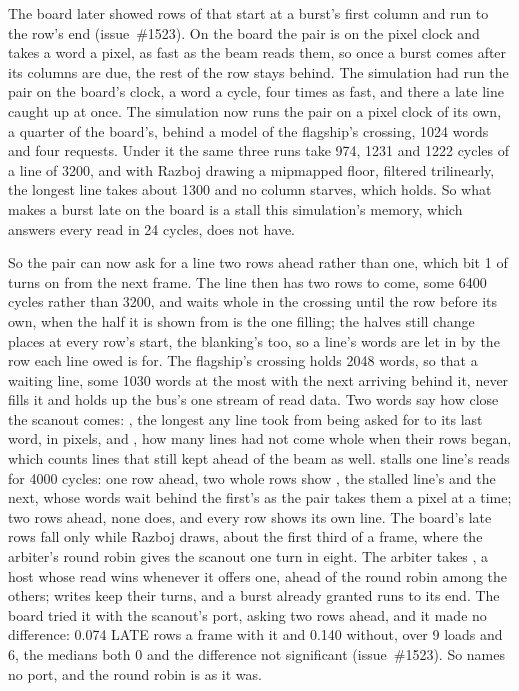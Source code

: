 \documentclass[journal,onecolumn,9pt]{IEEEtran}
\begin{document}
The board later showed rows of  that start at a burst's
first column and run to the row's end (issue~\#1523). On the board the
pair is on the pixel clock and takes a word a pixel, as fast as the
beam reads them, so once a burst comes after its columns are due, the
rest of the row stays behind. The simulation had run the pair on the
board's clock, a word a cycle, four times as fast, and there a late
line caught up at once. The simulation now runs the pair on a pixel
clock of its own, a quarter of the board's, behind a model of the
flagship's crossing, 1024 words and four requests. Under it the same
three runs take 974, 1231 and 1222 cycles of a line of 3200, and with
Razboj drawing a mipmapped floor, filtered trilinearly, the longest line
takes about 1300 and no column starves, which
 holds. So what makes a
burst late on the board is a stall this simulation's memory, which
answers every read in 24 cycles, does not have.

So the pair can now ask for a line two rows ahead rather than one,
which bit 1 of  turns on from the next frame. The line then
has two rows to come, some 6400 cycles rather than 3200, and waits
whole in the crossing until the row before its own, when the half it
is shown from is the one filling; the halves still change places at
every row's start, the blanking's too, so a line's words are let in by
the row each line owed is for. The flagship's crossing holds 2048
words, so that a waiting line, some 1030 words at the most with the
next arriving behind it, never fills it and holds up the bus's one
stream of read data. Two words say how close the scanout comes:
, the longest any line took from being asked for to its
last word, in pixels, and , how many lines had not come
whole when their rows began, which counts lines that still kept ahead
of the beam as well.
stalls one line's reads for 4000 cycles: one row ahead, two whole rows
show , the stalled line's and the next, whose words wait
behind the first's as the pair takes them a pixel at a time; two rows
ahead, none does, and every row shows its own line.
The board's late rows fall only while Razboj draws, about the first
third of a frame, where the arbiter's round robin gives the scanout one
turn in eight. The arbiter takes , a host whose read wins
whenever it offers one, ahead of the round robin among the others;
writes keep their turns, and a burst already granted runs to its end.
The board tried it with the scanout's port, asking two rows ahead, and
it made no difference: 0.074 LATE rows a frame with it and 0.140
without, over 9 loads and 6, the medians both 0 and the difference not
significant (issue~\#1523). So  names no port, and the
round robin is as it was.
\end{document}
